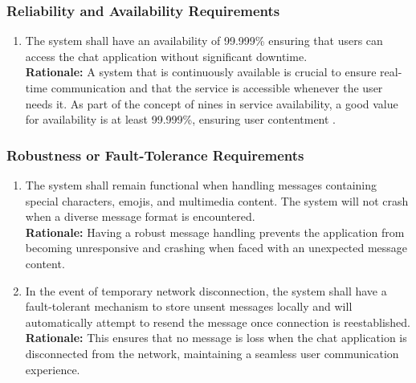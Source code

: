 \documentclass[]{article}
\begin{document}
\subsubsection{Reliability and Availability Requirements}
\label{ssub:reliability_and_availability_requirements}
\begin{enumerate}[{PR-RA}1. ]
    \item The system shall have an availability of 99.999\% ensuring that users can access the chat application without 
    significant downtime. \\
    {\bf Rationale:} A system that is continuously available is crucial to ensure real-time communication and that the service is accessible whenever
    the user needs it. As part of the concept of nines in service availability, a good value for availability is at least 99.999\%, ensuring 
    user contentment \cite{6c}.
\end{enumerate}
\subsubsection{Robustness or Fault-Tolerance Requirements}
\label{ssub:robustness_or_fault_tolerance_requirements}
\begin{enumerate}[{PR-RFT}1. ]
    \item The system shall remain functional when handling messages containing special characters, emojis, and
    multimedia content. The system will not crash when a diverse message format is encountered. \\
    {\bf Rationale:} Having a robust message handling prevents the application from becoming unresponsive and crashing 
    when faced with an unexpected message content.
    \item In the event of temporary network disconnection, the system shall have a fault-tolerant mechanism to store unsent messages locally and will automatically 
    attempt to resend the message once connection is reestablished. \\
    {\bf Rationale:} This ensures that no message is loss when the chat application is disconnected from the network, maintaining 
    a seamless user communication experience.
\end{enumerate}
\end{document}
